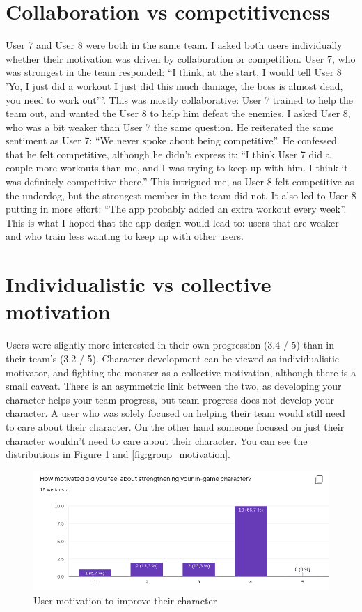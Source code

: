 \documentclass{l4proj}
\begin{document}
\section{Collaboration vs competitiveness} User 7 and User 8 were both in the same team. I asked both users individually whether their motivation was driven by collaboration or competition. User 7, who was strongest in the team responded: ``I think, at the start, I would tell User 8 'Yo, I just did a workout I just did this much damage, the boss is almost dead, you need to work out'''. This was mostly collaborative: User 7 trained to help the team out, and wanted the User 8 to help him defeat the enemies. I asked User 8, who was a bit weaker than User 7 the same question. He reiterated the same sentiment as User 7: ``We never spoke about being competitive''.  He confessed that he felt competitive, although he didn't express it: ``I think User 7 did a couple more workouts than me, and I was trying to keep up with him. I think it was definitely competitive there.'' This intrigued me, as User 8 felt competitive as the underdog, but the strongest member in the team did not. It also led to User 8 putting in more effort: ``The app probably added an extra workout every week''. This is what I hoped that the app design would lead to: users that are weaker and who train less wanting to keep up with other users.

\section{Individualistic vs collective motivation}
Users were slightly more interested in their own progression (3.4 / 5) than in their team's (3.2 / 5). Character development can be viewed as individualistic motivator, and fighting the monster as a collective motivation, although there is a small caveat. There is an asymmetric link between the two, as developing your character helps your team progress, but team progress does not develop your character. A user who was solely focused on helping their team would still need to care about their character. On the other hand someone focused on just their character wouldn't need to care about their character. You can see the distributions in Figure \ref{fig:character_motivation} and \ref{fig:group_motivation}.
\begin{figure}[H]
    \centering
    \includegraphics[width=1.0\linewidth]{ingame.png}    
    \caption{User motivation to improve their character}
    \label{fig:character_motivation} 
\end{figure}
\end{document}
